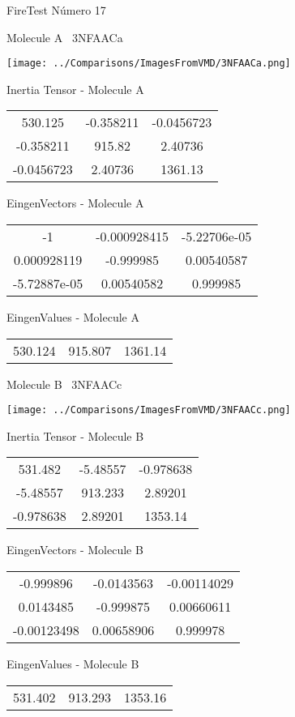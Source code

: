 \vtab[-3cm]
\begin{center}
{\large FireTest \tab Número 17}
\end{center}
\begin{multicols}{2}
\begin{center}

Molecule A \
3NFAACa

\texttt{[image: ../Comparisons/ImagesFromVMD/3NFAACa.png]}

Inertia Tensor - Molecule A \\
\begin{tabular}{|c c c|}
530.125	 & 	-0.358211	 & 	-0.0456723	 \\
-0.358211	 & 	915.82	 & 	2.40736	 \\
-0.0456723	 & 	2.40736	 & 	1361.13
\end{tabular}

\vtab
 EingenVectors - Molecule A     \\
\begin{tabular}{|c c c|}
-1	 & 	-0.000928415	 & 	-5.22706e-05	 \\
0.000928119	 & 	-0.999985	 & 	0.00540587	 \\
-5.72887e-05	 & 	0.00540582	 & 	0.999985
\end{tabular}

\vtab
 EingenValues - Molecule A     \\
\begin{tabular}{|c c c|}
530.124	 & 	915.807	 & 	1361.14	 \\
\end{tabular}
\columnbreak

Molecule B \
3NFAACc

\texttt{[image: ../Comparisons/ImagesFromVMD/3NFAACc.png]}

Inertia Tensor - Molecule B \\
\begin{tabular}{|c c c|}
531.482	 & 	-5.48557	 & 	-0.978638	 \\
-5.48557	 & 	913.233	 & 	2.89201	 \\
-0.978638	 & 	2.89201	 & 	1353.14
\end{tabular}

\vtab
 EingenVectors - Molecule B     \\
\begin{tabular}{|c c c|}
-0.999896	 & 	-0.0143563	 & 	-0.00114029	 \\
0.0143485	 & 	-0.999875	 & 	0.00660611	 \\
-0.00123498	 & 	0.00658906	 & 	0.999978
\end{tabular}

\vtab
 EingenValues - Molecule B     \\
\begin{tabular}{|c c c|}
531.402	 & 	913.293	 & 	1353.16	 \\
\end{tabular}

\end{center}
\end{multicols}


